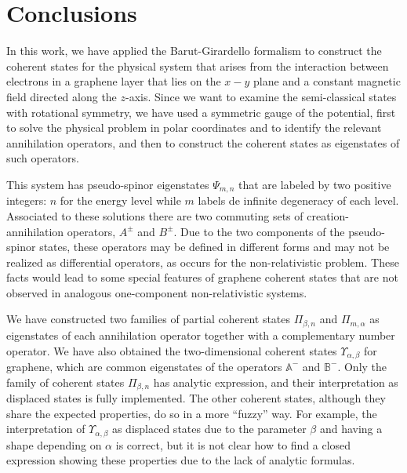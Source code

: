 \documentclass[aps,showpacs,showkeys]{revtex4}
\begin{document}
\section{Conclusions}\label{sec5}
In this work, we have applied the Barut-Girardello formalism to construct the coherent states for the physical system that arises from the interaction between electrons in a graphene layer that lies on the $x-y$ plane and a constant magnetic field directed along the $z$-axis. Since we want to examine the semi-classical states with rotational symmetry, we have used a symmetric gauge of the potential, first to solve the physical problem in polar coordinates and to identify the relevant annihilation operators, and then to construct the coherent states as eigenstates of such operators.

This system has pseudo-spinor eigenstates 	$\Psi_{m,n}$ that are labeled by two positive integers: $n$ for the energy level while $m$ labels de infinite degeneracy of each level. Associated to these solutions there are two commuting sets of creation-annihilation operators, $A^{\pm}$ and $B^{\pm}$. Due to the two components of the pseudo-spinor states, these operators may be defined in different forms and may not be realized as differential operators, as occurs for the non-relativistic problem. These facts would lead to some special features of graphene coherent states that are not observed in analogous one-component non-relativistic systems.

We have constructed two families of partial coherent states $\Pi_{\beta,n}$ and $\Pi_{m,\alpha}$ as eigenstates of each annihilation operator together with a complementary number operator. We have also obtained the two-dimensional coherent states $\Upsilon_{\alpha,\beta}$ for graphene, which are common eigenstates of the operators $\mathbb{A}^-$ and $\mathbb{B}^-$. Only the family of coherent states $\Pi_{\beta,n}$ has analytic expression, and their interpretation as displaced states is fully implemented. The other coherent states, although they share the expected properties, do so in a more ``fuzzy'' way. For example, the interpretation of $\Upsilon_{\alpha,\beta}$ as displaced states due to the parameter $\beta$ and having a shape depending on $\alpha$ is correct, but it is not clear how to find a closed expression showing these properties due to the lack of analytic formulas.
\end{document}
